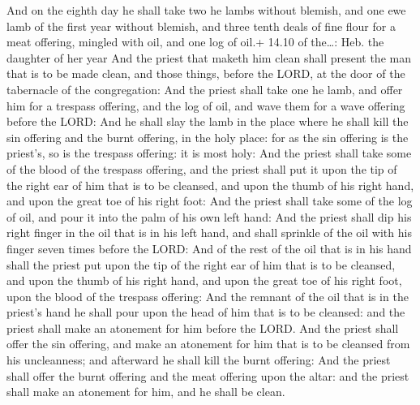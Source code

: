  And on the eighth day he shall take two he lambs without
blemish, and one ewe lamb of the first year without blemish, and three
tenth deals of fine flour for a meat offering, mingled with oil, and one
log of oil.+ 14.10 of the\ldots: Heb. the daughter of her year
 And the priest that maketh him clean shall present the man
that is to be made clean, and those things, before the LORD, at the door
of the tabernacle of the congregation:  And the priest
shall take one he lamb, and offer him for a trespass offering, and the
log of oil, and wave them for a wave offering before the LORD:
 And he shall slay the lamb in the place where he shall
kill the sin offering and the burnt offering, in the holy place: for as
the sin offering is the priest's, so is the trespass offering: it is
most holy:  And the priest shall take some of the blood of
the trespass offering, and the priest shall put it upon the tip of the
right ear of him that is to be cleansed, and upon the thumb of his right
hand, and upon the great toe of his right foot:  And the
priest shall take some of the log of oil, and pour it into the palm of
his own left hand:  And the priest shall dip his right
finger in the oil that is in his left hand, and shall sprinkle of the
oil with his finger seven times before the LORD:  And of
the rest of the oil that is in his hand shall the priest put upon the
tip of the right ear of him that is to be cleansed, and upon the thumb
of his right hand, and upon the great toe of his right foot, upon the
blood of the trespass offering:  And the remnant of the oil
that is in the priest's hand he shall pour upon the head of him that is
to be cleansed: and the priest shall make an atonement for him before
the LORD.  And the priest shall offer the sin offering, and
make an atonement for him that is to be cleansed from his uncleanness;
and afterward he shall kill the burnt offering:  And the
priest shall offer the burnt offering and the meat offering upon the
altar: and the priest shall make an atonement for him, and he shall be
clean.

